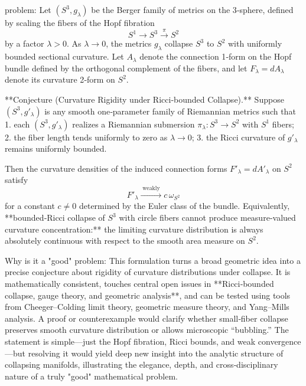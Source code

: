 problem:  
Let \( (S^3,g_\lambda) \) be the Berger family of metrics on the 3‑sphere, defined by scaling the fibers of the Hopf fibration  
\[
S^1 \longrightarrow S^3 \xrightarrow{\pi} S^2
\]
by a factor \(\lambda>0\).  As \(\lambda \to 0\), the metrics \(g_\lambda\) collapse \(S^3\) to \(S^2\) with uniformly bounded sectional curvature.  
Let \(A_\lambda\) denote the connection 1‑form on the Hopf bundle defined by the orthogonal complement of the fibers, and let \(F_\lambda=dA_\lambda\) denote its curvature 2‑form on \(S^2\).  

**Conjecture (Curvature Rigidity under Ricci‑bounded Collapse).**  
Suppose \( (S^3,g'_\lambda) \) is any smooth one‑parameter family of Riemannian metrics such that  
1. each \( (S^3,g'_\lambda) \) realizes a Riemannian submersion \( \pi_\lambda:S^3\to S^2\) with \(S^1\) fibers;  
2. the fiber length tends uniformly to zero as \(\lambda\to 0\);  
3. the Ricci curvature of \(g'_\lambda\) remains uniformly bounded.  

Then the curvature densities of the induced connection forms \(F'_\lambda=dA'_\lambda\) on \(S^2\) satisfy  
\[
F'_\lambda \xrightarrow{\;\text{weakly}\;} c\,\omega_{S^2}
\]
for a constant \(c\neq 0\) determined by the Euler class of the bundle.  
Equivalently, **bounded‑Ricci collapse of \(S^3\) with circle fibers cannot produce measure‑valued curvature concentration:** the limiting curvature distribution is always absolutely continuous with respect to the smooth area measure on \(S^2\).  

Why is it a "good" problem:  
This formulation turns a broad geometric idea into a precise conjecture about rigidity of curvature distributions under collapse.  It is mathematically consistent, touches central open issues in **Ricci‑bounded collapse, gauge theory, and geometric analysis**, and can be tested using tools from Cheeger–Colding limit theory, geometric measure theory, and Yang–Mills analysis.  A proof or counterexample would clarify whether small‑fiber collapse preserves smooth curvature distribution or allows microscopic “bubbling.”  The statement is simple—just the Hopf fibration, Ricci bounds, and weak convergence—but resolving it would yield deep new insight into the analytic structure of collapsing manifolds, illustrating the elegance, depth, and cross‑disciplinary nature of a truly "good" mathematical problem.